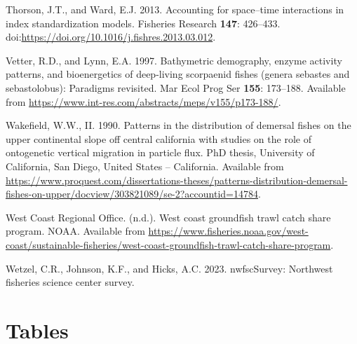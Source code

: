 \documentclass[11pt,
  letterpaper,
]{article}
\newlength{\cslhangindent}
\newenvironment{CSLReferences}[2] %
 {%
  \setlength{\parindent}{0pt}
  \ifodd #1 \everypar{\setlength{\hangindent}{\cslhangindent}}\ignorespaces\fi
  \ifnum #2 > 0
  \setlength{\parskip}{#2\baselineskip}
  \fi
 }%
 {}
\begin{document}
\begin{CSLReferences}{1}{0}
\leavevmode{}%
Thorson, J.T., and Ward, E.J. 2013. Accounting for space--time interactions in index standardization models. Fisheries Research \textbf{147}: 426--433. doi:\url{https://doi.org/10.1016/j.fishres.2013.03.012}.

\leavevmode{}%
Vetter, R.D., and Lynn, E.A. 1997. Bathymetric demography, enzyme activity patterns, and bioenergetics of deep-living scorpaenid fishes (genera sebastes and sebastolobus): Paradigms revisited. Mar Ecol Prog Ser \textbf{155}: 173--188. Available from \url{https://www.int-res.com/abstracts/meps/v155/p173-188/}.

\leavevmode{}%
Wakefield, W.W., II. 1990. Patterns in the distribution of demersal fishes on the upper continental slope off central california with studies on the role of ontogenetic vertical migration in particle flux. PhD thesis, University of California, San Diego, United States -- California. Available from \url{https://www.proquest.com/dissertations-theses/patterns-distribution-demersal-fishes-on-upper/docview/303821089/se-2?accountid=14784}.

\leavevmode{}%
West Coast Regional Office. (n.d.). West coast groundfish trawl catch share program. {NOAA}. Available from \url{https://www.fisheries.noaa.gov/west-coast/sustainable-fisheries/west-coast-groundfish-trawl-catch-share-program}.

\leavevmode{}%
Wetzel, C.R., Johnson, K.F., and Hicks, A.C. 2023. nwfscSurvey: Northwest fisheries science center survey.

\end{CSLReferences}

\clearpage

\hypertarget{tables}{%
\section{Tables}\label{tables}}

\begingroup\fontsize{10}{12}\selectfont
\begingroup\fontsize{10}{12}\selectfont
\end{document}
